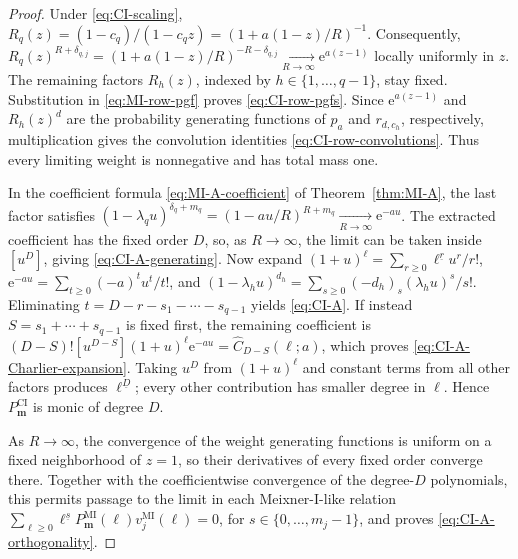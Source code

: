 \documentclass[10pt]{amsart}
\newcommand{\e}{\mathrm e}
\newcommand{\mm}{\boldsymbol m}
\newcommand{\fall}[2]{#1^{\underline{#2}}}
\theoremstyle{plain}
\theoremstyle{definition}
\theoremstyle{remark}
\begin{document}
\begin{proof}
Under \eqref{eq:CI-scaling},
\(R_q(z)=(1-c_q)/(1-c_qz)
=(1+a(1-z)/R)^{-1}\). Consequently,
\(R_q(z)^{R+\delta_{q,j}}
=(1+a(1-z)/R)^{-R-\delta_{q,j}}
\xrightarrow[R\to\infty]{}\e^{a(z-1)}\) locally uniformly in
\(z\). The remaining factors \(R_h(z)\), indexed by
\(h\in\{1,\ldots,q-1\}\),
stay fixed.  Substitution in \eqref{eq:MI-row-pgf} proves
\eqref{eq:CI-row-pgfs}.  Since \(\e^{a(z-1)}\) and \(R_h(z)^d\) are the
probability generating functions of \(p_a\) and \(r_{d,c_h}\),
respectively, multiplication gives the convolution identities
\eqref{eq:CI-row-convolutions}. Thus every limiting weight is nonnegative
and has total mass one.

In the coefficient formula \eqref{eq:MI-A-coefficient} of
Theorem~\ref{thm:MI-A}, the last factor satisfies
\((1-\lambda_qu)^{\delta_q+m_q}
=(1-au/R)^{R+m_q}\xrightarrow[R\to\infty]{}\e^{-au}\).
The extracted coefficient has the fixed order \(D\), so, as \(R\to\infty\), the limit can be
taken inside \([u^D]\), giving \eqref{eq:CI-A-generating}. Now expand
\((1+u)^\ell=\sum_{r\ge0}\fall{\ell}{r}u^r/r!\),
\(\e^{-au}=\sum_{t\ge0}(-a)^tu^t/t!\), and
\((1-\lambda_hu)^{d_h}
=\sum_{s\ge0}(-d_h)_s(\lambda_hu)^s/s!\).
Eliminating
\(t=D-r-s_1-\cdots-s_{q-1}\) yields \eqref{eq:CI-A}.  If instead
\(S=s_1+\cdots+s_{q-1}\) is fixed first, the remaining coefficient is
\((D-S)![u^{D-S}](1+u)^\ell\e^{-au}
=\widehat C_{D-S}(\ell;a)\),
which proves \eqref{eq:CI-A-Charlier-expansion}.  Taking \(u^D\) from
\((1+u)^\ell\) and constant terms from all other factors produces
\(\fall{\ell}{D}\); every other contribution has smaller degree in
\(\ell\).  Hence \(P_{\mm}^{\mathrm{CI}}\) is monic of degree \(D\).

As \(R\to\infty\), the convergence of the weight generating functions is uniform on a fixed
neighborhood of \(z=1\), so their derivatives of every fixed order
converge there.  Together with the coefficientwise convergence of the
degree-\(D\) polynomials, this permits passage to the limit in each
Meixner-I-like relation
\(\sum_{\ell\ge0}\fall{\ell}{s}
P_{\mm}^{\mathrm{MI}}(\ell)v_j^{\mathrm{MI}}(\ell)=0\),
for \(s\in\{0,\ldots,m_j-1\}\),
and proves \eqref{eq:CI-A-orthogonality}.


\end{proof}
\end{document}
